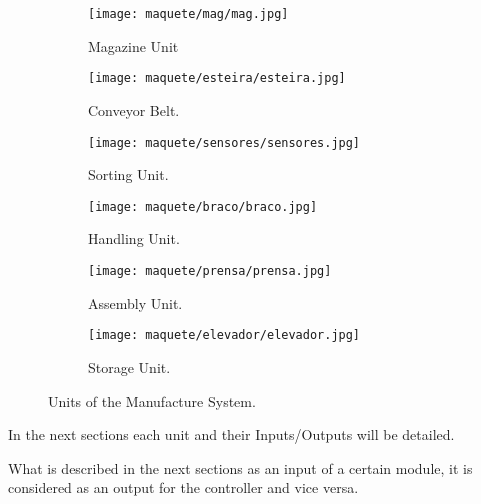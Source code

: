 \begin{figure}[H]
\begin{subfigure}[t]{0.325\textwidth}
  \centering
  \texttt{[image: maquete/mag/mag.jpg]}
  \caption{Magazine Unit}
\end{subfigure}
\hfill
\begin{subfigure}[t]{0.325\textwidth}
  \centering
  \texttt{[image: maquete/esteira/esteira.jpg]}
  \caption{Conveyor Belt.}
\end{subfigure}

\begin{subfigure}[t]{0.325\textwidth}
  \centering
  \texttt{[image: maquete/sensores/sensores.jpg]}
  \caption{Sorting Unit.}
\end{subfigure}
\hfill
\begin{subfigure}[t]{0.325\textwidth}
  \centering
  \texttt{[image: maquete/braco/braco.jpg]}
  \caption{Handling Unit.}
\end{subfigure}

\begin{subfigure}[t]{0.325\textwidth}
  \centering
  \texttt{[image: maquete/prensa/prensa.jpg]}
  \caption{Assembly Unit.}
\end{subfigure}
\hfill
\begin{subfigure}[t]{0.325\textwidth}
  \centering
  \texttt{[image: maquete/elevador/elevador.jpg]}
  \caption{Storage Unit.}
\end{subfigure}
  \caption{Units of the Manufacture System.}
  \label{fig:units}
\end{figure}

In the next sections each unit and their Inputs\slash Outputs will be detailed.

\begin{observation}
What is described in the next sections as an input of a certain module, it is
considered as an output for the controller and vice versa.  
\end{observation}

